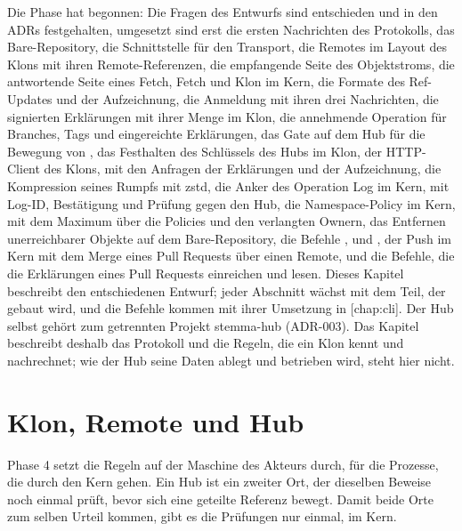 Die Phase hat begonnen: Die Fragen des Entwurfs sind entschieden und in den ADRs festgehalten,
umgesetzt sind erst die ersten Nachrichten des Protokolls, das Bare-Repository,
die Schnittstelle für den Transport,
die Remotes im Layout des Klons mit ihren Remote-Referenzen,
die empfangende Seite des Objektstroms,
die antwortende Seite eines Fetch,
Fetch und Klon im Kern,
die Formate des Ref-Updates und der Aufzeichnung,
die Anmeldung mit ihren drei Nachrichten,
die signierten Erklärungen mit ihrer Menge im Klon,
die annehmende Operation für Branches, Tags und eingereichte Erklärungen,
das Gate auf dem Hub für die Bewegung von ,
das Festhalten des Schlüssels des Hubs im Klon,
der HTTP-Client des Klons, mit den Anfragen der Erklärungen und der Aufzeichnung,
die Kompression seines Rumpfs mit zstd,
die Anker des Operation Log im Kern, mit Log-ID, Bestätigung und Prüfung gegen den Hub,
die Namespace-Policy im Kern, mit dem Maximum über die Policies und den verlangten Ownern,
das Entfernen unerreichbarer Objekte auf dem Bare-Repository,
die Befehle ,  und ,
der Push im Kern mit dem Merge eines Pull Requests über einen Remote,
und die Befehle, die die Erklärungen eines Pull Requests einreichen und lesen.
Dieses Kapitel beschreibt den entschiedenen Entwurf; jeder Abschnitt wächst mit dem Teil, der
gebaut wird, und die Befehle kommen mit ihrer Umsetzung in [chap:cli].
Der Hub selbst gehört zum getrennten Projekt stemma-hub (ADR-003).
Das Kapitel beschreibt deshalb das Protokoll und die Regeln, die ein Klon kennt und nachrechnet;
wie der Hub seine Daten ablegt und betrieben wird, steht hier nicht.

\section[sec:remote-split]{Klon, Remote und Hub}

Phase 4 setzt die Regeln auf der Maschine des Akteurs durch, für die Prozesse, die durch den Kern
gehen.
Ein Hub ist ein zweiter Ort, der dieselben Beweise noch einmal prüft, bevor sich eine geteilte
Referenz bewegt.
Damit beide Orte zum selben Urteil kommen, gibt es die Prüfungen nur einmal, im Kern.

